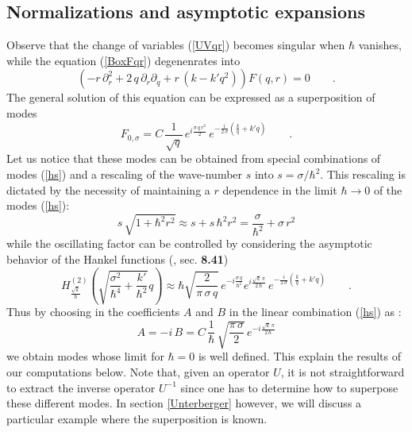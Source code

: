 \documentclass{article}
\begin{document}
\subsection{Normalizations and asymptotic expansions}\label{Norasympt}
\noindent Observe that the   change of variables (\ref{UVqr}) becomes singular when $\hbar$ vanishes, while the  equation (\ref{BoxFqr}) degenenrates into
\begin{equation}\label{BoxFqrdeg}
(-r\,\partial_r^2+2\,q\,\partial_r\partial_q+r\,(k-k'q^2))F(q,r)=0\qquad .
\end{equation}
The general solution of this equation can be expressed as a superposition of modes
\begin{equation}
F_{0,\sigma}=C\,\frac 1{\sqrt q}\,e^{i\frac{\sigma\,q\,r^2}2}\,e^{-\frac i{2\,\sigma}\left(\frac k q +k'q\right)}\qquad.
\end{equation}
Let us notice that these modes can be obtained from special combinations of modes (\ref{hs}) and a rescaling of the wave-number $s$ into $s=\sigma/\hbar^2$.
This rescaling is dictated by the necessity of maintaining a $r$ dependence in the limit $\hbar \rightarrow 0$ of the modes (\ref{hs}):
\begin{equation}
s\,\sqrt{1+\hbar^2r^2}\approx s + s\,\hbar^2r^2=\frac \sigma{\hbar^2}+\sigma \,r^2
\end{equation}
while the oscillating factor can be controlled by considering the asymptotic behavior of the  Hankel functions (\cite{Wa}, sec. {\bf 8.41})
\begin{equation}
H^{(2)}_{\frac{\sqrt k}{\hbar}}(\sqrt{\frac{\sigma^2}{\hbar^4}+\frac{k'}{\hbar^2}}q)\approx \hbar \sqrt{\frac 2{\pi\,\sigma\,q}}\,e^{-i\frac{\sigma\,q}{\hbar^2}}
e^{i\frac{\sqrt k\,\pi}{2\,\hbar}}\,e^{-\frac i{2\,\sigma}\left(\frac k q +k'q\right)}\qquad .
\end{equation}
Thus by choosing in the coefficients $A$ and $B$ in the linear combination (\ref{hs}) as :
\begin{equation}
A=-i\,B=C\,\frac 1 \hbar\,\sqrt{\frac{\pi\,\sigma}2}\,e^{-i\frac {\sqrt{k}\,\pi}{2\,\hbar}}
\end{equation}
we obtain   modes whose limit for $\hbar =0$ is well defined. This explain the results of our computations below.
 Note that, given an operator $U$, it is not straightforward to extract the inverse operator $U^{-1}$ since one has to determine how to superpose these different modes. In section \ref{Unterberger} however, we will discuss a particular example where the superposition is known.
\end{document}
